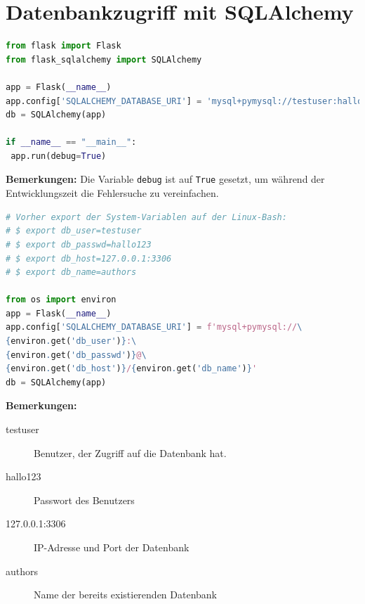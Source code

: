 \documentclass[a4paper,titlepage,halfparskip,12pt,listof=numbered]{scrreprt}
\begin{document}
\chapter{Datenbankzugriff mit SQLAlchemy}
\label{chap:DBaccessSQLAlchemy}

\begin{lstlisting}[language=python,caption={Konfiguration der Flask Applikation mit SQLAlchemy}, label={lst:configFlaskSQLAlchemy}]
from flask import Flask
from flask_sqlalchemy import SQLAlchemy

app = Flask(__name__)
app.config['SQLALCHEMY_DATABASE_URI'] = 'mysql+pymysql://testuser:hallo123@127.0.0.1:3306/authors'
db = SQLAlchemy(app)

if __name__ == "__main__":
 app.run(debug=True)
\end{lstlisting}

\textbf{Bemerkungen:} Die Variable \texttt{debug} ist auf \texttt{True} gesetzt, um während der Entwicklungszeit die Fehlersuche zu vereinfachen.

\bigskip

\begin{lstlisting}[language=python,caption={Konfiguration mit System-Variablen für den Schutz sensibler Zugangsdaten, Ausschnitt des Codes}, label={lst:configFlaskSQLAlchemySecure}]
# Vorher export der System-Variablen auf der Linux-Bash:
# $ export db_user=testuser
# $ export db_passwd=hallo123
# $ export db_host=127.0.0.1:3306
# $ export db_name=authors

from os import environ
app = Flask(__name__)
app.config['SQLALCHEMY_DATABASE_URI'] = f'mysql+pymysql://\
{environ.get('db_user')}:\
{environ.get('db_passwd')}@\
{environ.get('db_host')}/{environ.get('db_name')}'
db = SQLAlchemy(app)

\end{lstlisting}

\textbf{Bemerkungen:}

\begin{description}
\item[testuser] Benutzer, der Zugriff auf die Datenbank hat.
\item[hallo123] Passwort des Benutzers
\item[127.0.0.1:3306] IP-Adresse und Port der Datenbank
\item[authors] Name der bereits existierenden Datenbank
\end{description}

\pagebreak
\end{document}

